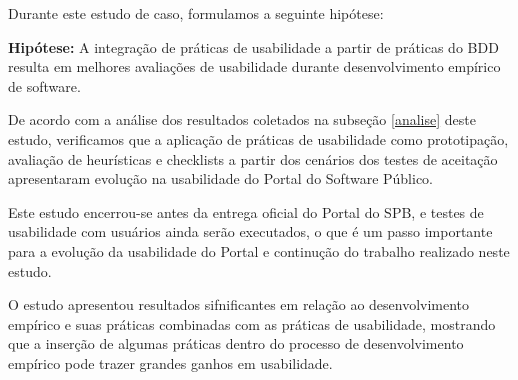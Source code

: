 
Durante este estudo de caso, formulamos a seguinte hipótese:

\textbf{Hipótese: } A integração de práticas de usabilidade a partir de práticas do BDD resulta em melhores avaliações de usabilidade durante desenvolvimento empírico de software.

De acordo com a análise dos resultados coletados na subseção \ref{analise} deste estudo, verificamos que a aplicação de práticas de usabilidade como prototipação, avaliação de heurísticas e checklists a partir dos cenários dos testes de aceitação apresentaram evolução na usabilidade do Portal do Software Público.

Este estudo encerrou-se antes da entrega oficial do Portal do SPB, e testes de usabilidade com usuários ainda serão executados, o que é um passo importante para a evolução da usabilidade do Portal e continução do trabalho realizado neste estudo.

O estudo apresentou resultados sifnificantes em relação ao desenvolvimento empírico	e suas práticas combinadas com as práticas de usabilidade, mostrando que a inserção de algumas práticas dentro do processo de desenvolvimento empírico pode trazer grandes ganhos em usabilidade.

